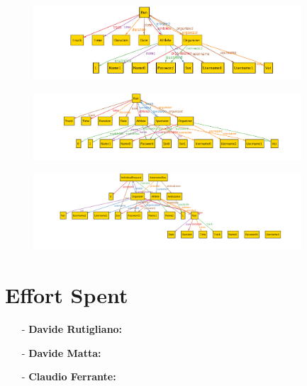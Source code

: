 \documentclass[a4paper]{article}
\begin{document}
    
    \begin{figure}[!htpb]
    	\centering
    	\includegraphics[width=100mm]{images/alloy/enrollRun.png}
    \end{figure}
    
    
    \begin{figure}[!htpb]
    	\centering
    	\includegraphics[width=100mm]{images/alloy/watchRun.png}
    \end{figure}
    
    
    \begin{figure}[!htpb]
    	\centering
    	\includegraphics[width=100mm]{images/alloy/trackMe.png}
    \end{figure}
\newpage
\section{Effort Spent}
    \begin{itemize}
        \item[-] \textbf{Davide Rutigliano:}
        
        \item[-] \textbf{Davide Matta:}
        
        \item[-] \textbf{Claudio Ferrante:}
    \end{itemize}
\end{document}
